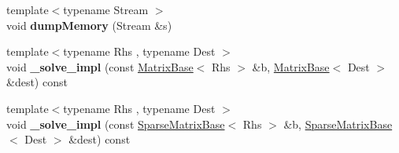 \begin{DoxyCompactItemize}
\mbox{\label{group___sparse_cholesky___module_a61efd39e3f15e6864552953bdd4f29c7}} 
{\footnotesize template$<$typename Stream $>$ }\\void {\bfseries dump\+Memory} (Stream \&s)
\item 
\mbox{\label{group___sparse_cholesky___module_a37ab9aaf6c2cbb4cc15ecbba7e424c74}} 
{\footnotesize template$<$typename Rhs , typename Dest $>$ }\\void {\bfseries \+\_\+solve\+\_\+impl} (const \hyperlink{group___core___module_class_eigen_1_1_matrix_base}{Matrix\+Base}$<$ Rhs $>$ \&b, \hyperlink{group___core___module_class_eigen_1_1_matrix_base}{Matrix\+Base}$<$ Dest $>$ \&dest) const
\item 
\mbox{\label{group___sparse_cholesky___module_a64793e46e9815288b9a429cc7b63a6bb}} 
{\footnotesize template$<$typename Rhs , typename Dest $>$ }\\void {\bfseries \+\_\+solve\+\_\+impl} (const \hyperlink{group___sparse_core___module_class_eigen_1_1_sparse_matrix_base}{Sparse\+Matrix\+Base}$<$ Rhs $>$ \&b, \hyperlink{group___sparse_core___module_class_eigen_1_1_sparse_matrix_base}{Sparse\+Matrix\+Base}$<$ Dest $>$ \&dest) const
\end{DoxyCompactItemize}
